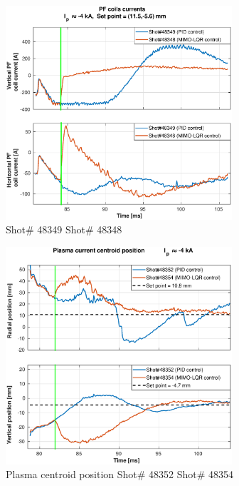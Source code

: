 \begin{figure}
	\centering
	\includegraphics[width=0.75\textwidth]{Chp5/PIDvsMIMO_349_348_curr_2.eps}
	\caption{ Shot\# 48349 Shot\# 48348}
\end{figure}


\begin{figure}
	\centering
	\includegraphics[width=0.75\textwidth]{Chp5/PIDvsMIMO_352_354_2.eps}
	\caption{Plasma centroid position Shot\# 48352 Shot\# 48354}
\end{figure}

